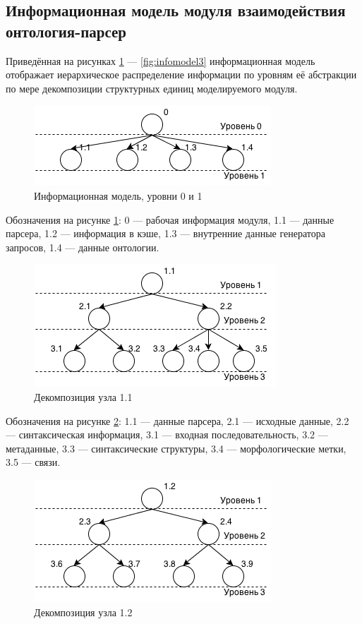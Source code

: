 \subsection[Информационная модель модуля взаимодействия онтология-парсер]{Информационная модель модуля взаимодействия\\ онтология-парсер}

Приведённая на рисунках \ref{fig:infomodel0} --- \ref{fig:infomodel3} информационная модель отображает иерархическое распределение информации по уровням её абстракции по мере декомпозиции структурных единиц моделируемого модуля.

\begin{figure}[H]
	\centering
		\includegraphics[scale=1.0]{images/infomodel0.png}
	\caption{\small Информационная модель, уровни 0 и 1}
	\label{fig:infomodel0}
\end{figure}

Обозначения на рисунке \ref{fig:infomodel0}: 0 --- рабочая информация модуля, 1.1 --- данные парсера, 1.2 --- информация в кэше, 1.3 --- внутренние данные генератора запросов, 1.4 --- данные онтологии.

\begin{figure}[H]
	\centering
		\includegraphics[scale=1.0]{images/infomodel1.png}
	\caption{\small Декомпозиция узла 1.1}
	\label{fig:infomodel1}
\end{figure}

Обозначения на рисунке \ref{fig:infomodel1}: 1.1 --- данные парсера, 2.1 --- исходные данные, 2.2 --- синтаксическая информация, 3.1 --- входная последовательность, 3.2 --- метаданные, 3.3 --- синтаксические структуры, 3.4 --- морфологические метки, 3.5 --- связи.

\begin{figure}[H]
	\centering
		\includegraphics[scale=1.0]{images/infomodel2.png}
	\caption{\small Декомпозиция узла 1.2}
	\label{fig:infomodel2}
\end{figure}

